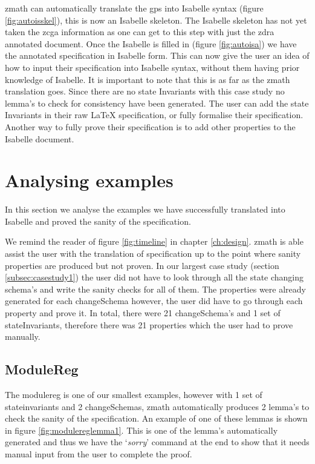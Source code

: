 \Gls{zmath} can automatically translate the \gls{gps} into Isabelle syntax
(figure \ref{fig:autoisskel}), this is now an Isabelle skeleton. The Isabelle
skeleton has not yet taken the \gls{zcga} information as one can get to this
step with just the \gls{zdra} annotated document. Once the Isabelle is filled in
(figure \ref{fig:autoisa}) we have the annotated specification in Isabelle form.
This can now give the user an idea of how to input their specification into
Isabelle syntax, without them having prior knowledge of Isabelle. It is
important to note that this is as far as the \gls{zmath} translation goes. Since
there are no state Invariants with this case study no lemma's to check for
consistency have been generated. The user can add the state Invariants in their
raw \LaTeX{} specification, or fully formalise their specification. Another way
to fully prove their specification is to add other properties to the Isabelle
document.



\section{Analysing examples}

In this section we analyse the examples we have successfully translated into
Isabelle and proved the sanity of the specification. 

We remind the reader of figure \ref{fig:timeline} in chapter \ref{ch:design}.
\Gls{zmath} is able assist the user with the translation of specification up to
the point where sanity properties are produced but not proven. In our largest
case study (section \ref{subsec:casestudy1}) the user did not have to look
through all the state changing schema's and write the sanity checks for all of
them. The properties were already generated for each changeSchema however, the
user did have to go through each property and prove it. In total, there were 21
changeSchema's and 1 set of stateInvariants, therefore there was 21 properties
which the user had to prove manually.


\subsection{ModuleReg}

The modulereg is one of our smallest examples, however with 1 set of
stateinvariants and 2 changeSchemas, \gls{zmath} automatically produces 2 lemma's
to check the sanity of the specification. An example of one of these lemmas is
shown in figure \ref{fig:modulereglemma1}. This is one of the lemma's
automatically generated and thus we have the `\emph{sorry}' command at the end
to show that it needs manual input from the user to complete the proof.

